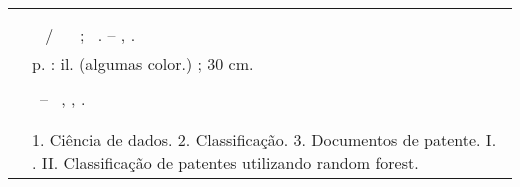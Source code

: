 %
\begin{fichacatalografica}
	\hspace{-1.4cm}
	\imprimirnotaautorizacao \\ \\
	\vspace*{\fill}					%
	\begin{center}					%
		\imprimirnotabib \\
\begin{table}[htb]
	\scriptsize
	\centering	
	\begin{tabular}{|p{0.9cm} p{8.7cm}|}
		\hline
	      & \\
		  &	  \imprimirautorficha     \\
		
		 \imprimircutter & 
							\hspace{0.4cm}\imprimirtitulo~  / ~\imprimirautor~ ;  ~\imprimirorientadorcorpoficha. -- 	\imprimirlocal, \imprimirdata.   \\
		
		  &  %
		
			\hspace{0.4cm}\pageref{LastPage} p. : il. (algumas color.) ; 30 cm.\\ 
		  & \\
		  & 
		    \hspace{0.4cm}\imprimirnotaficha ~--~ 
						  \imprimirunidademin, 
						  \imprimiruniversidademin, 
		                  \imprimirdata. \\ 
		  & \\                 
		  & \\ 
		  & \hspace{0.4cm}1. Ciência de dados. 2. Classificação. 3. Documentos de patente. I. \imprimirorientadorficha. 
		   II. Classificação de patentes utilizando random forest. \\
	

\end{tabular}
\end{table}
\end{center}
\end{fichacatalografica}
